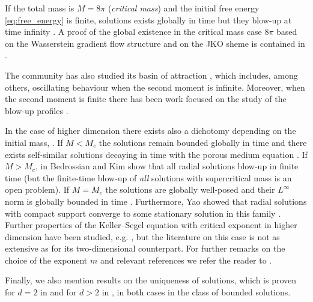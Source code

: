 \documentclass[11pt,a4paper]{article}
\numberwithin{equation}{section}
\theoremstyle{plain}
\theoremstyle{remark}
\begin{document}
If the total mass is $M= 8 \pi$ (\textit{critical mass}) and the initial free energy \eqref{eq:free_energy} is finite, solutions exists globally in time but they blow-up at time infinity \cite{Biler_Karch_Laurencot_Nadzieja06, Blanchet_Carrillo_Masmoudi08}. A proof of the global existence in the critical mass case $8\pi$ based on the Wasserstein gradient flow structure and on the JKO sheme is contained in \cite{KarWol}.

The community has also studied its basin of attraction \cite{Blanchet_Carlen_Carrillo12, Lopez-Gomez_Nagai_Yamada13, Lopez-Gomez_Nagai_Yamada14}, which includes, among others, oscillating behaviour when the second moment is infinite. Moreover, when the second moment is finite there has been work focused on the study of the blow-up profiles \cite{Ghoul_Masmoudi18, Davila_delPino_Dolbeault_Musso_Wei24}.

In the case of higher dimension there exists also a dichotomy depending on the initial mass, \cite{Sugiyama07}. If $M < M_c$ the solutions remain bounded globally in time and there exists self-similar solutions decaying in time with the porous medium equation \cite{Blanchet_Carrillo_Laurencot09, Bedrossian11}. If $M > M_c$, in \cite{Bedrossian_Kim13} Bedrossian and Kim show that all radial solutions blow-up in finite time (but the finite-time blow-up of {\it all} solutions with supercritical mass is an open problem). If $M = M_c$ the solutions are globally well-posed and their $L^\infty$ norm is globally bounded in time \cite{Blanchet_Carrillo_Laurencot09}. Furthermore, Yao showed that radial solutions with compact support converge to some stationary solution in this family \cite{Yao14}. Further properties of the Keller--Segel equation with critical exponent in higher dimension have been studied, e.g. \cite{Kim_Yao12, Calvez_Carrillo_Hoffmann17, Carrillo_Santambrogio18, Carrillo_Delgadino_Patacchini19, Carrillo_Hittmeir_Volzone_Yao19}, but the literature on this case is not as extensive as for its two-dimensional counterpart. For further remarks on the choice of the exponent $m$ and relevant references we refer the reader to . 

Finally, we also mention results on the uniqueness of solutions, which is proven for $d=2$ in \cite{Carrillo_Lisini_Mainini14} and for $d > 2$ in \cite{Bedrossian_Rodriguez_Bertozzi11}, in both cases in the class of bounded solutions.
\end{document}
